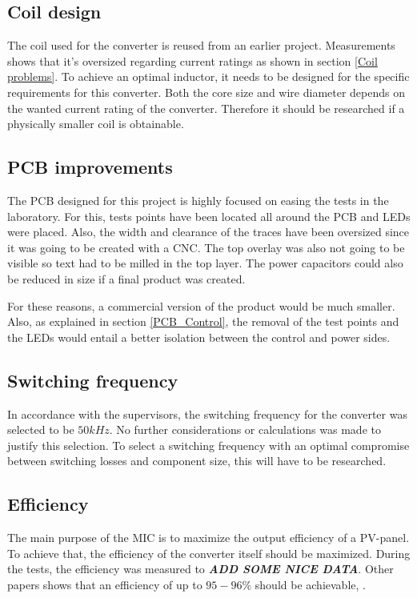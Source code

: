 \subsection{Coil design}
The coil used for the converter is reused from an earlier project. Measurements shows that it's oversized regarding current ratings as shown in section \ref{Coil problems}. To achieve an optimal inductor, it needs to be designed for the specific requirements for this converter. Both the core size and wire diameter depends on the wanted current rating of the converter\cite{underthehood}. Therefore it should be researched if a physically smaller coil is obtainable.

\subsection{PCB improvements}
The PCB designed for this project is highly focused on easing the tests in the laboratory. For this, tests points have been located all around the PCB and LEDs were placed. Also, the width and clearance of the traces have been oversized since it was going to be created with a CNC. The top overlay was also not going to be visible so text had to be milled in the top layer. The power capacitors could also be reduced in size if a final product was created.

For these reasons, a commercial version of the product would be much smaller. Also, as explained in section \ref{PCB_Control}, the removal of the test points and the LEDs would entail a better isolation between the control and power sides.

\subsection{Switching frequency}
In accordance with the supervisors, the switching frequency for the converter was selected to be $50kHz$. No further considerations or calculations was made to justify this selection. To select a switching frequency with an optimal compromise between switching losses and component size, this will have to be researched. 


\subsection{Efficiency}
The main purpose of the MIC is to maximize the output efficiency of a PV-panel. To achieve that, the efficiency of the converter itself should be maximized. During the tests, the efficiency was measured to \textbf{\textit{ADD SOME NICE DATA}}. Other papers shows that an efficiency of up to $95-96\%$ should be achievable\cite{underthehood}, \cite{efficient_buckboost}. 
